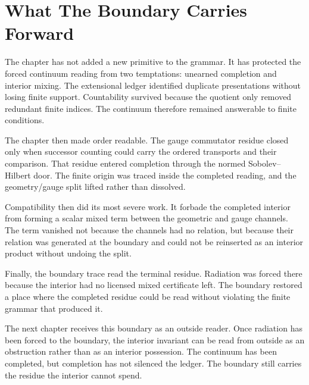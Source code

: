 \section{What The Boundary Carries Forward}

The chapter has not added a new primitive to the grammar. It has protected
the forced continuum reading from two temptations: unearned completion and
interior mixing. The extensional ledger identified duplicate presentations
without losing finite support. Countability survived because the quotient
only removed redundant finite indices. The continuum therefore remained
answerable to finite conditions.

The chapter then made order readable. The gauge commutator residue closed
only when successor counting could carry the ordered transports and their
comparison. That residue entered completion through the normed
Sobolev--Hilbert door. The finite origin was traced inside the completed
reading, and the geometry/gauge split lifted rather than dissolved.

Compatibility then did its most severe work. It forbade the completed
interior from forming a scalar mixed term between the geometric and gauge
channels. The term vanished not because the channels had no relation, but
because their relation was generated at the boundary and could not be
reinserted as an interior product without undoing the split.

Finally, the boundary trace read the terminal residue. Radiation was forced
there because the interior had no licensed mixed certificate left. The
boundary restored a place where the completed residue could be read without
violating the finite grammar that produced it.

The next chapter receives this boundary as an outside reader. Once radiation
has been forced to the boundary, the interior invariant can be read from
outside as an obstruction rather than as an interior possession. The
continuum has been completed, but completion has not silenced the ledger.
The boundary still carries the residue the interior cannot spend.
